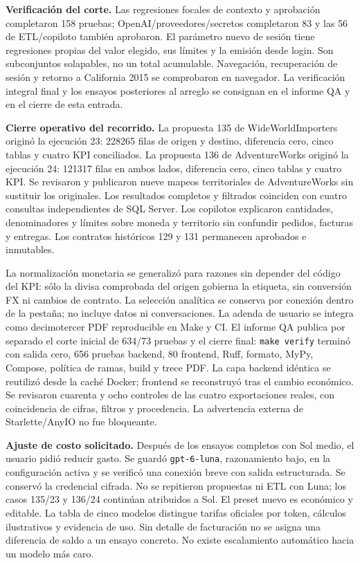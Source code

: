 \documentclass[11pt,letterpaper]{article}
\newcommand{\file}[1]{\texttt{#1}}
\begin{document}
\textbf{Verificación del corte.} Las regresiones focales de contexto y aprobación
completaron 158 pruebas; OpenAI/proveedores/secretos completaron 83 y las 56 de
ETL/copiloto también aprobaron. El parámetro nuevo de sesión tiene regresiones
propias del valor elegido, sus límites y la emisión desde login. Son subconjuntos solapables,
no un total acumulable. Navegación, recuperación de sesión y retorno a California 2015 se comprobaron
en navegador. La verificación integral final y los ensayos posteriores al arreglo
se consignan en el informe QA y en el cierre de esta entrada.


\textbf{Cierre operativo del recorrido.} La propuesta 135 de WideWorldImporters
originó la ejecución 23: 228265 filas de origen y destino, diferencia cero,
cinco tablas y cuatro KPI conciliados. La propuesta 136 de AdventureWorks originó
la ejecución 24: 121317 filas en ambos lados, diferencia cero, cinco tablas y
cuatro KPI. Se revisaron y publicaron nueve mapeos territoriales de AdventureWorks
sin sustituir los originales. Los resultados completos y filtrados coinciden con
cuatro consultas independientes de SQL Server. Los copilotos explicaron cantidades,
denominadores y límites sobre moneda y territorio sin confundir pedidos, facturas
y entregas. Los contratos históricos 129 y 131 permanecen aprobados e inmutables.

La normalización monetaria se generalizó para razones sin depender del código del
KPI: sólo la divisa comprobada del origen gobierna la etiqueta, sin conversión FX
ni cambios de contrato. La selección analítica se conserva por conexión dentro de
la pestaña; no incluye datos ni conversaciones. La adenda de usuario se integra
como decimotercer PDF reproducible en Make y CI. El informe QA publica por separado
el corte inicial de 634/73 pruebas y el cierre final: \file{make verify} terminó
con salida cero, 656 pruebas backend, 80 frontend, Ruff, formato, MyPy, Compose,
política de ramas, build y trece PDF. La capa backend idéntica se reutilizó desde
la caché Docker; frontend se reconstruyó tras el cambio económico. Se revisaron
cuarenta y ocho controles de las cuatro exportaciones reales, con coincidencia de
cifras, filtros y procedencia. La advertencia externa de Starlette/AnyIO no fue bloqueante.

\textbf{Ajuste de costo solicitado.} Después de los ensayos completos con Sol
medio, el usuario pidió reducir gasto. Se guardó \file{gpt-6-luna}, razonamiento
bajo, en la configuración activa y se verificó una conexión breve con salida
estructurada. Se conservó la credencial cifrada. No se repitieron propuestas ni
ETL con Luna; los casos 135/23 y 136/24 continúan atribuidos a Sol. El preset
nuevo es económico y editable. La tabla de cinco modelos distingue tarifas
oficiales por token, cálculos ilustrativos y evidencia de uso. Sin detalle de
facturación no se asigna una diferencia de saldo a un ensayo concreto. No existe
escalamiento automático hacia un modelo más caro.
\end{document}
